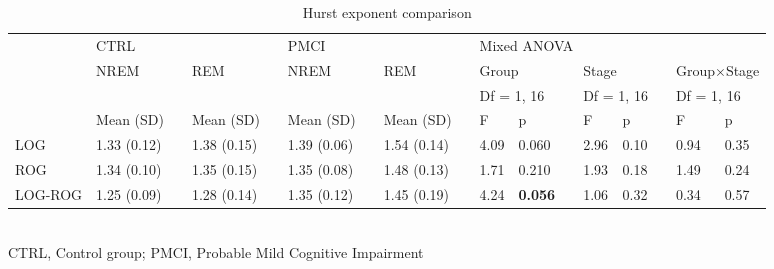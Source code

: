 \documentclass[10pt]{article}
\begin{document}
\setlength\tabcolsep{3pt}

\begin{table}
\caption{Hurst exponent comparison}
\begin{small}
\begin{tabular}{lllllllllllllllll}
\toprule
 & \multicolumn{3}{l}{CTRL} & \phantom{.}  & \multicolumn{3}{l}{PMCI} & \phantom{.} & \multicolumn{8}{l}{Mixed ANOVA} \\
\cmidrule{2-4} \cmidrule{6-8} \cmidrule{10-17}
 & NREM &  & REM   & & NREM &  & REM  &  & 
   \multicolumn{2}{l}{Group} &  & \multicolumn{2}{l}{Stage} & & \multicolumn{2}{l}{Group$\times$Stage}  \\
 &&&&&&&&& \multicolumn{2}{l}{Df = 1, 16} &  &  \multicolumn{2}{l}{Df = 1, 16}  &  &  \multicolumn{2}{l}{Df = 1, 16}  \\
\cmidrule{2-2} \cmidrule{4-4} \cmidrule{6-6} \cmidrule{8-8} \cmidrule{10-11} \cmidrule{13-14} \cmidrule{16-17}    
 & Mean (SD) &  & Mean (SD) &  & Mean (SD) &  & Mean (SD) &  & F & p &  & F & p &  & F & p \\
\midrule
LOG&1.33 (0.12) &&1.38 (0.15) &&1.39 (0.06) &&1.54 (0.14) &&4.09& 0.060&&2.96&0.10&&0.94&0.35 \\
ROG&1.34 (0.10) &&1.35 (0.15) &&1.35 (0.08) &&1.48 (0.13) &&1.71&0.210&&1.93&0.18&&1.49&0.24 \\
LOG-ROG&1.25 (0.09) &&1.28 (0.14) &&1.35 (0.12) &&1.45 (0.19) &&4.24&\bf 0.056&&1.06&0.32&&0.34&0.57 \\
\bottomrule
\end{tabular}\\
CTRL, Control group; PMCI, Probable Mild Cognitive Impairment
\end{small}
\end{table}
\end{document}
